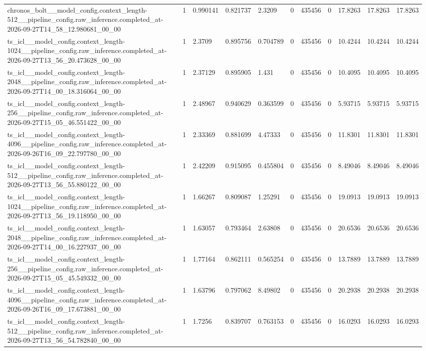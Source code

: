\begin{tabular}{lllllllllll}
chronos\_bolt\_\_model\_config.context\_length-512\_\_pipeline\_config.raw\_inference.completed\_at-2026-09-27T14\_58\_12.980681\_00\_00 & 1 & 0.990141 & 0.821737 & 2.3209 & 0 & 435456 & 0 & 17.8263 & 17.8263 & 17.8263 \\
ts\_icl\_\_model\_config.context\_length-1024\_\_pipeline\_config.raw\_inference.completed\_at-2026-09-27T13\_56\_20.473628\_00\_00 & 1 & 2.3709 & 0.895756 & 0.704789 & 0 & 435456 & 0 & 10.4244 & 10.4244 & 10.4244 \\
ts\_icl\_\_model\_config.context\_length-2048\_\_pipeline\_config.raw\_inference.completed\_at-2026-09-27T14\_00\_18.316064\_00\_00 & 1 & 2.37129 & 0.895905 & 1.431 & 0 & 435456 & 0 & 10.4095 & 10.4095 & 10.4095 \\
ts\_icl\_\_model\_config.context\_length-256\_\_pipeline\_config.raw\_inference.completed\_at-2026-09-27T15\_05\_46.551422\_00\_00 & 1 & 2.48967 & 0.940629 & 0.363599 & 0 & 435456 & 0 & 5.93715 & 5.93715 & 5.93715 \\
ts\_icl\_\_model\_config.context\_length-4096\_\_pipeline\_config.raw\_inference.completed\_at-2026-09-26T16\_09\_22.797780\_00\_00 & 1 & 2.33369 & 0.881699 & 4.47333 & 0 & 435456 & 0 & 11.8301 & 11.8301 & 11.8301 \\
ts\_icl\_\_model\_config.context\_length-512\_\_pipeline\_config.raw\_inference.completed\_at-2026-09-27T13\_56\_55.880122\_00\_00 & 1 & 2.42209 & 0.915095 & 0.455804 & 0 & 435456 & 0 & 8.49046 & 8.49046 & 8.49046 \\
ts\_icl\_\_model\_config.context\_length-1024\_\_pipeline\_config.raw\_inference.completed\_at-2026-09-27T13\_56\_19.118950\_00\_00 & 1 & 1.66267 & 0.809087 & 1.25291 & 0 & 435456 & 0 & 19.0913 & 19.0913 & 19.0913 \\
ts\_icl\_\_model\_config.context\_length-2048\_\_pipeline\_config.raw\_inference.completed\_at-2026-09-27T14\_00\_16.227937\_00\_00 & 1 & 1.63057 & 0.793464 & 2.63808 & 0 & 435456 & 0 & 20.6536 & 20.6536 & 20.6536 \\
ts\_icl\_\_model\_config.context\_length-256\_\_pipeline\_config.raw\_inference.completed\_at-2026-09-27T15\_05\_45.549332\_00\_00 & 1 & 1.77164 & 0.862111 & 0.565254 & 0 & 435456 & 0 & 13.7889 & 13.7889 & 13.7889 \\
ts\_icl\_\_model\_config.context\_length-4096\_\_pipeline\_config.raw\_inference.completed\_at-2026-09-26T16\_09\_17.673881\_00\_00 & 1 & 1.63796 & 0.797062 & 8.49802 & 0 & 435456 & 0 & 20.2938 & 20.2938 & 20.2938 \\
ts\_icl\_\_model\_config.context\_length-512\_\_pipeline\_config.raw\_inference.completed\_at-2026-09-27T13\_56\_54.782840\_00\_00 & 1 & 1.7256 & 0.839707 & 0.763153 & 0 & 435456 & 0 & 16.0293 & 16.0293 & 16.0293 \\

\end{tabular}
